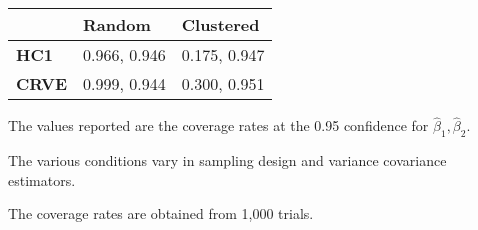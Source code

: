 \begin{threeparttable}
	\begin{tabularx}{\textwidth}{Y Y Y}
		\toprule
		& \textbf{Random} & \textbf{Clustered}     \\
		\midrule
		\textbf{HC1}  & 0.966, 0.946 & 0.175, 0.947 \\
		\textbf{CRVE} & 0.999, 0.944 & 0.300, 0.951 \\
		\bottomrule
	\end{tabularx}
	\begin{tablenotes}
		\small
		\item The values reported are the coverage rates at the 0.95 confidence for $\hat{\beta}_{1}, \hat{\beta}_{2}$.
		\item The various conditions vary in sampling design and variance covariance estimators.
		\item The coverage rates are obtained from 1,000 trials.
	\end{tablenotes}
\end{threeparttable}
